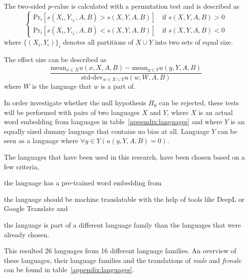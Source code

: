 The two-sided $p$-value is calculated with a permutation test and is described as
$$
\begin{cases}
    \text{Pr}_i[s(X_i, Y,_i, A, B) > s(X,Y,A,B)] \quad \text{if } s(X,Y,A,B) > 0 \\
    \text{Pr}_i[s(X_i, Y,_i, A, B) < s(X,Y,A,B)] \quad \text{if } s(X,Y,A,B) < 0
\end{cases}
$$
where $\{(X_i, Y_i)\}_i$ denotes all partitions of $X \cup Y$ into two sets of equal 
size.

The effect size can be described as
$$
\frac{
    \text{mean}_{x \in X} u(x, X, A, B) - \text{mean}_{y \in Y} u(y, Y, A, B)
}{
    \text{std-dev}_{w \in X \cup Y} u(w,W,A,B)
}
$$
where $W$ is the language that $w$ is a part of.

In order investigate whether the null hypothesis $H_0$ can be rejected, these tests will
be performed with pairs of two languages $X$ and $Y$, where $X$ is an actual word embedding
from languages in table~\ref{appendix:languages} and where $Y$ is an equally sized dummy
language that
contains no bias at all. Language $Y$ can be seen as a language where
$\forall y \in Y(u(y,Y,A,B) = 0)$.

The languages that have been used in this research, have been chosen based on a
few criteria,
\begin{seriate}
    \item the language has a pre-trained word embedding from \textcite{grave2018learning}
    \item the language should be machine translatable with the help of tools like DeepL or
    Google Translate and
    \item the language is part of a different language family than the languages that
    were already chosen.
\end{seriate}
This resulted 26 languages from 16 different language families. An overview of these languages, their language families and the translations of \textit{male} and \textit{female}
can be found in table~\ref{appendix:languages}.
